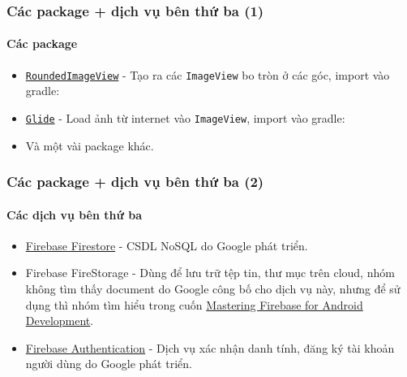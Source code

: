\documentclass{beamer}
\begin{document}
\begin{frame}[fragile]
    \frametitle{Các package + dịch vụ bên thứ ba (1)}
    \framesubtitle{Các package}
        \begin{itemize}
            \item \textnormal{\href{https://github.com/vinc3m1/RoundedImageView}{\color{blue} \texttt{RoundedImageView}} - Tạo ra các \texttt{ImageView} bo tròn ở các góc, import vào gradle:}\\

            \item \textnormal{\href{https://github.com/bumptech/glide}{\color{blue} \texttt{Glide}} - Load ảnh từ internet vào \texttt{ImageView}, import vào gradle:}\\

            \item Và một vài package khác.
        \end{itemize}
\end{frame}

\begin{frame}
    \frametitle{Các package + dịch vụ bên thứ ba (2)}
    \framesubtitle{Các dịch vụ bên thứ ba}
    \begin{flushleft}
        \begin{itemize}
            \item \textnormal{\href{https://firebase.google.com/docs/firestore/quickstart}{\color{blue} \textsf{Firebase Firestore}} - CSDL NoSQL do Google phát triển.}

            \item \textnormal{Firebase FireStorage - Dùng để lưu trữ tệp tin, thư mục trên cloud, nhóm không tìm thấy document do Google công bố cho dịch vụ này, nhưng để sử dụng thì nhóm tìm hiểu trong cuốn} \href{https://www.amazon.com/Mastering-Firebase-Android-Development-cloud-enabled/dp/1788624718}{\color{teal} Mastering Firebase for Android Development}.

            \item \textnormal{\href{https://firebase.google.com/docs/auth/android/start}{\color{blue} \textsf{Firebase Authentication}} - Dịch vụ xác nhận danh tính, đăng ký tài khoản người dùng do Google phát triển.}
        \end{itemize}
    \end{flushleft}
\end{frame}
\end{document}
